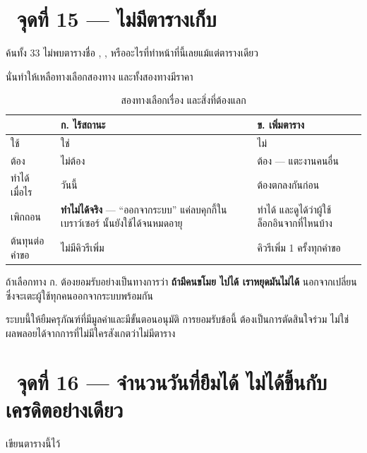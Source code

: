 \section{\pzero\ จุดที่ 15 --- ไม่มีตารางเก็บ }

ค้นทั้ง 33  ไม่พบตารางชื่อ , ,
 หรืออะไรที่ทำหน้าที่นี้เลยแม้แต่ตารางเดียว

นั่นทำให้เหลือทางเลือกสองทาง และทั้งสองทางมีราคา

\begin{table}[htbp]
\centering
\footnotesize\sansall
\caption{สองทางเลือกเรื่อง  และสิ่งที่ต้องแลก}
\label{tab:session}
\begin{tabular}{@{}L{3.4cm}L{4.6cm}L{4.6cm}@{}}
\toprule
& \textbf{ก.  ไร้สถานะ} & \textbf{ข. เพิ่มตาราง } \\
\midrule
{} ใช้ & ใช่ & ไม่ \\
\addlinespace[2pt]
ต้อง  & ไม่ต้อง & ต้อง --- แตะงานคนอื่น \\
\addlinespace[2pt]
ทำได้เมื่อไร & วันนี้ & ต้องตกลงกันก่อน \\
\addlinespace[2pt]
เพิกถอน  & \textbf{ทำไม่ได้จริง} --- ``ออกจากระบบ''
แค่ลบคุกกี้ในเบราว์เซอร์  นั้นยังใช้ได้จนหมดอายุ &
ทำได้ และดูได้ว่าผู้ใช้ล็อกอินจากที่ไหนบ้าง \\
\addlinespace[2pt]
ต้นทุนต่อคำขอ & ไม่มีคิวรีเพิ่ม & คิวรีเพิ่ม 1 ครั้งทุกคำขอ \\
\bottomrule
\end{tabular}
\end{table}

\begin{warnbox}[title={ประโยคที่ต้องเข้าที่ประชุม}]
ถ้าเลือกทาง ก. ต้องยอมรับอย่างเป็นทางการว่า
\textbf{ถ้ามีคนขโมย  ไปได้ เราหยุดมันไม่ได้} นอกจากเปลี่ยน
 ซึ่งจะเตะผู้ใช้ทุกคนออกจากระบบพร้อมกัน

ระบบนี้ให้ยืมครุภัณฑ์ที่มีมูลค่าและมีขั้นตอนอนุมัติ การยอมรับข้อนี้
ต้องเป็นการตัดสินใจร่วม ไม่ใช่ผลพลอยได้จากการที่ไม่มีใครสังเกตว่าไม่มีตาราง
\end{warnbox}

\section{\pone\ จุดที่ 16 --- จำนวนวันที่ยืมได้ ไม่ได้ขึ้นกับเครดิตอย่างเดียว}

 เขียนตารางนี้ไว้

